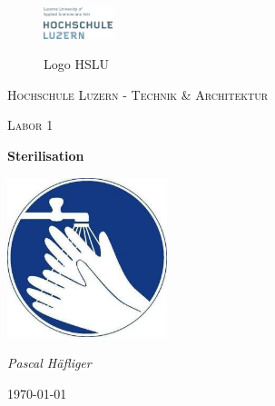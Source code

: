 
\begin{titlepage}
	\centering
	
	\begin{figure}[H]
        \centering
        \includegraphics[width=0.18\textwidth]{pic/logo.png}
        \label{fig:logo_hslu}


        
        \captionsetup{textformat=empty,labelformat=empty} %
        \caption{Logo HSLU}
    \end{figure}

	
	
	\par\vspace{1cm}
	{\scshape\LARGE Hochschule Luzern - Technik \& Architektur\par}
	\vspace{1cm}
	{\scshape\Large Labor 1\par}
	\vspace{1.5cm}
	{\huge\bfseries Sterilisation\par}
	\vspace{2cm}
	\includegraphics[width=0.35\textwidth]{pic/title.jpg}
	\par\vspace{1cm}
	{\Large\itshape Pascal Häfliger\par}
	



	

	\vfill  %

	{\large \today\par}
\end{titlepage}



\clearpage